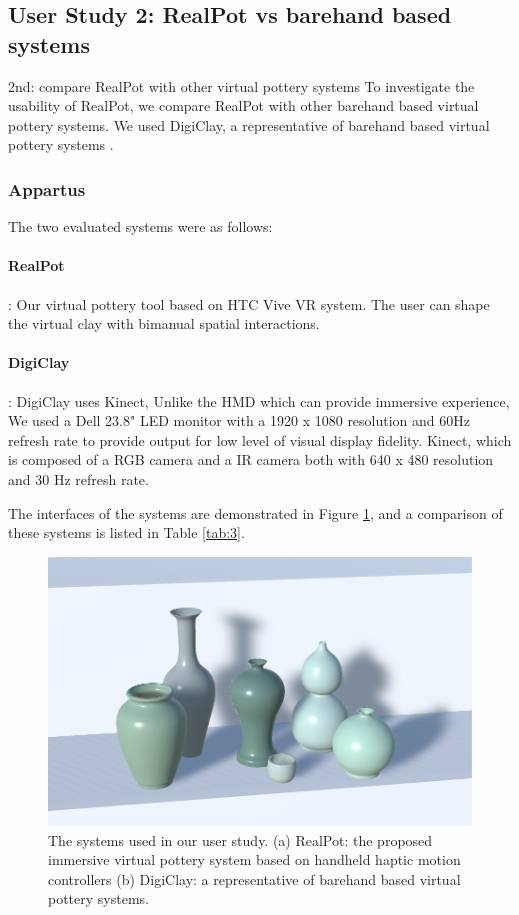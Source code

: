 \documentclass{svjour3}                     %
\begin{document}
\subsection{User Study 2: RealPot vs barehand based systems}

2nd: compare RealPot with other virtual pottery systems
To investigate the usability of RealPot, we compare RealPot with other barehand based virtual pottery systems. We used DigiClay, a representative of barehand based virtual pottery systems \cite{gao2018digiclay}.






\subsubsection{Appartus}

The two evaluated systems were as follows:

\paragraph{RealPot}: Our virtual pottery tool based on HTC Vive VR system. The user can shape the virtual clay with bimanual spatial interactions.

\paragraph{DigiClay}: DigiClay uses Kinect,
Unlike the HMD which can provide immersive experience, We used a Dell 23.8" LED monitor with a 1920 x 1080 resolution and 60Hz refresh rate 
to provide output for low level of visual display fidelity.
Kinect, which is composed of a RGB camera and a IR camera both with 640 x 480 resolution and 30 Hz refresh rate.


The interfaces of the systems are demonstrated in Figure \ref{fig:sys}, and a comparison of these systems is listed in Table \ref{tab:3}. 


\begin{figure}
\includegraphics[width=\textwidth]{fig11}
\caption{The systems used in our user study. (a) RealPot: the proposed immersive virtual pottery system based on handheld haptic motion controllers (b) DigiClay: a representative of barehand based virtual pottery systems.}
\label{fig:sys}
\end{figure}
\end{document}
